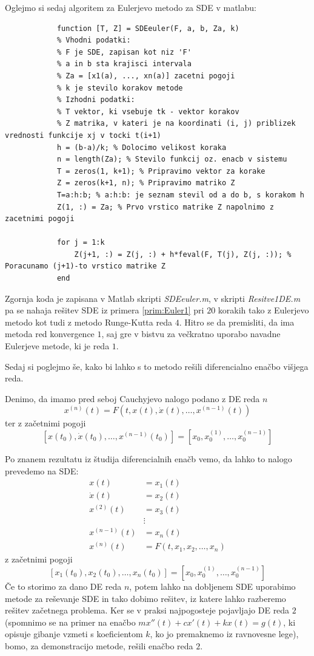 \documentclass[a4paper, 10pt]{article}
\begin{document}
		Oglejmo si sedaj algoritem za Eulerjevo metodo za SDE v matlabu:
		
		\begin{lstlisting}
			function [T, Z] = SDEeuler(F, a, b, Za, k)
			% Vhodni podatki:
			% F je SDE, zapisan kot niz 'F'
			% a in b sta krajisci intervala
			% Za = [x1(a), ..., xn(a)] zacetni pogoji
			% k je stevilo korakov metode
			% Izhodni podatki:
			% T vektor, ki vsebuje tk - vektor korakov
			% Z matrika, v kateri je na koordinati (i, j) priblizek vrednosti funkcije xj v tocki t(i+1)
			h = (b-a)/k; % Dolocimo velikost koraka
			n = length(Za); % Stevilo funkcij oz. enacb v sistemu
			T = zeros(1, k+1); % Pripravimo vektor za korake
			Z = zeros(k+1, n); % Pripravimo matriko Z
			T=a:h:b; % a:h:b: je seznam stevil od a do b, s korakom h
			Z(1, :) = Za; % Prvo vrstico matrike Z napolnimo z zacetnimi pogoji
			
			for j = 1:k
				Z(j+1, :) = Z(j, :) + h*feval(F, T(j), Z(j, :)); % Poracunamo (j+1)-to vrstico matrike Z
			end
		\end{lstlisting}
		
		Zgornja koda je zapisana v Matlab skripti \emph{SDEeuler.m}, v skripti \emph{Resitve1DE.m} pa se nahaja rešitev SDE iz primera \ref{prim:Euler1} pri $20$ korakih tako z Eulerjevo metodo kot tudi z metodo Runge-Kutta reda $4$. Hitro se da premisliti, da ima metoda red konvergence $1$, saj gre v bistvu za večkratno uporabo navadne Eulerjeve metode, ki je reda $1$.
		
		Sedaj si poglejmo še, kako bi lahko s to metodo rešili diferencialno enačbo višjega reda.
		
		Denimo, da imamo pred seboj Cauchyjevo nalogo podano z DE reda $n$ $$x^{(n)}(t) = F(t, x(t), \dot{x}(t), \ldots, x^{(n-1)}(t))$$ ter z začetnimi pogoji $$[x(t_0), \dot{x}(t_0), \ldots, x^{(n-1)}(t_0)]= [x_0, x^{(1)}_0, \ldots, x^{(n-1)}_0]$$
		
		Po znanem rezultatu iz študija diferencialnih enačb vemo, da lahko to nalogo prevedemo na SDE: \begin{align*}
			x(t) &= x_1(t) \\
			\dot{x}(t) &= x_2(t) \\
			x^{(2)}(t) &= x_3(t) \\
			&\vdots \\
			x^{(n-1)}(t) &= x_n(t) \\
			x^{(n)}(t) &= F(t, x_1, x_2, \ldots, x_n)
		\end{align*} z začetnimi pogoji $$[x_1(t_0), x_2(t_0), \ldots, x_{n}(t_0)]= [x_0, x^{(1)}_0, \ldots, x^{(n-1)}_0]$$
		Če to storimo za dano DE reda $n$, potem lahko na dobljenem SDE uporabimo metode za reševanje SDE in tako dobimo rešitev, iz katere lahko razberemo rešitev začetnega problema. Ker se v praksi najpogosteje pojavljajo DE reda $2$ (spomnimo se na primer na enačbo $mx''(t) + cx'(t) + kx(t) = g(t)$, ki opisuje gibanje vzmeti s koeficientom $k$, ko jo premaknemo iz ravnovesne lege), bomo, za demonstracijo metode, rešili enačbo reda $2$.
		
\end{document}
